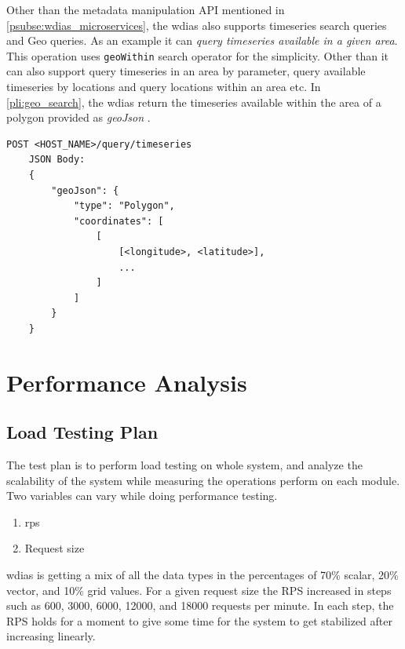 \documentclass[conference]{IEEEtran}
\begin{document}
Other than the metadata manipulation API mentioned in \cref{psubse:wdias_microservices}, the \acrshort{wdias} also supports timeseries search queries and Geo queries. As an example it can \emph{query timeseries available in a given area}. This operation uses \texttt{geoWithin} search operator for the simplicity. Other than it can also support query timeseries in an area by parameter, query available timeseries by locations and query locations within an area etc. In \cref{pli:geo_search}, the \acrshort{wdias} return the timeseries available within the area of a polygon provided as \emph{geoJson} \cite{InternetEngineeringTaskForceGeoJSON}.

\begin{lstlisting}[caption=Geo search timeseries, label=pli:geo_search]
    POST <HOST_NAME>/query/timeseries
    JSON Body:
    {
        "geoJson": {
            "type": "Polygon",
            "coordinates": [
                [
                    [<longitude>, <latitude>],
                    ...
                ]
            ]
        }
    }
\end{lstlisting}

\section{Performance Analysis}
\label{pse:performance_analysis}

\subsection{Load Testing Plan}
\label{psubse:test_plan}

The test plan is to perform load testing on whole system, and analyze the scalability of the system while measuring the operations perform on each module. Two variables can vary while doing performance testing.
\begin{enumerate}
    \item \acrfull{rps}
    \item Request size
\end{enumerate}

\acrshort{wdias} is getting a mix of all the data types in the percentages of 70\% scalar, 20\% vector, and 10\% grid values.
For a given request size the RPS increased in steps such as 600, 3000, 6000, 12000, and 18000 requests per minute. In each step, the RPS holds for a moment to give some time for the system to get stabilized after increasing linearly.
\end{document}
